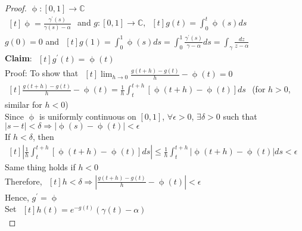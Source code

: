 \begin{proof}
$\upphi:[0,1] \rightarrow \mathds{C}$\\
$\begin{aligned}[t] \upphi= \frac{\gamma^{'}(s)}{\gamma(s)-\alpha} \end{aligned}$ and $g:[0,1]\rightarrow \mathds{C}$, $\begin{aligned}[t]g(t)=\int_{0}^{t} \upphi(s) ds\end{aligned}$\\
$g(0)=0$ and $\begin{aligned}[t] g(1)=\int_{0}^{1} \upphi(s) ds= \int_{0}^{1} \frac{\gamma^{'}(s)}{\gamma-\alpha} ds= \int_{\gamma}^{} \frac{dz}{z-\alpha} \end{aligned}$\\
\textbf{Claim}: $\begin{aligned}[t] g^{'}(t)=\upphi(t) \end{aligned}$\\
Proof: To show that $\begin{aligned}[t] \lim_{h \to 0}\frac{g(t+h)-g(t)}{h}-\upphi(t)=0 \end{aligned}$\\
$\begin{aligned}[t] \frac{g(t+h)-g(t)}{h}-\upphi(t)=\frac{1}{h}\int_{t}^{t+h}[\upphi(t+h)-\upphi(t)] ds \end{aligned}$ \:(for $h>0$, similar for $h<0$)\\
Since $\upphi$ is uniformly continuous on $[0,1]$, $\forall \epsilon >0$, $\exists \delta>0$ such that \\
$|s-t|<\delta \Rightarrow |\upphi(s)-\upphi(t)|<\epsilon$ \\
If $h<\delta$, then\\
$\begin{aligned}[t] |\frac{1}{h}\int_{t}^{t+h}[\upphi(t+h)-\upphi(t)]ds|\leq \frac{1}{h}\int_{t}^{t+h}|\upphi(t+h)-\upphi(t)| ds<\epsilon \end{aligned}$\\
Same thing holds if $h<0$\\
Therefore, $\begin{aligned}[t] h<\delta \Rightarrow |\frac{g(t+h)-g(t)}{h}-\upphi(t)|<\epsilon \end{aligned}$\\
Hence, $g^{'}=\upphi$\\
Set $\begin{aligned}[t] h(t)=e^{-g(t)}(\gamma(t)-\alpha)\end{aligned}$\\

\end{proof}
